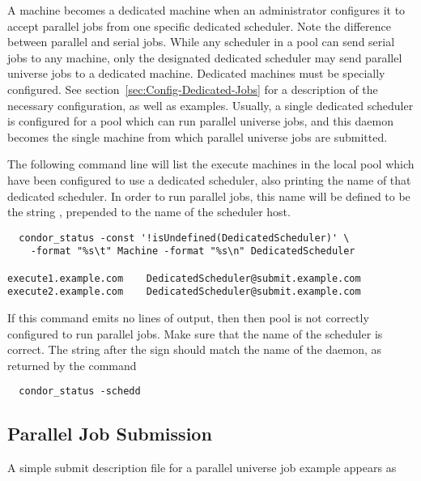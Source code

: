 A machine becomes a dedicated machine when an administrator configures
it to accept parallel jobs from one specific dedicated scheduler.  
Note the difference between parallel and serial jobs.
While any scheduler in a pool can send serial jobs to any machine,
only the designated dedicated scheduler may send parallel universe
jobs to a dedicated machine.
Dedicated machines must be specially configured.  
See section~\ref{sec:Config-Dedicated-Jobs} for a description
of the necessary configuration, as well as examples.
Usually, a single dedicated scheduler is configured for a pool
which can run parallel universe jobs, and this  daemon
becomes the single machine from which parallel universe
jobs are submitted.

The following command line will list the execute machines 
in the local pool which have been configured to use a dedicated
scheduler, also printing the name of that dedicated scheduler.
In order to run parallel jobs, this name will be defined to be
the string , prepended to the name of the
scheduler host.

\footnotesize
\begin{verbatim}
  condor_status -const '!isUndefined(DedicatedScheduler)' \
	-format "%s\t" Machine -format "%s\n" DedicatedScheduler

execute1.example.com	DedicatedScheduler@submit.example.com
execute2.example.com	DedicatedScheduler@submit.example.com

\end{verbatim}
\normalsize

If this command emits no lines of output, then then pool is
not correctly configured to run parallel jobs.
Make sure that the name of the scheduler is correct. 
The string after the  sign should match the name of the 
\Condor{schedd} daemon, as returned by the command

\begin{verbatim}
  condor_status -schedd
\end{verbatim}

\subsection{\label{sec:parallel-submit}Parallel Job Submission}

A simple submit description file for a parallel universe
job example appears as


